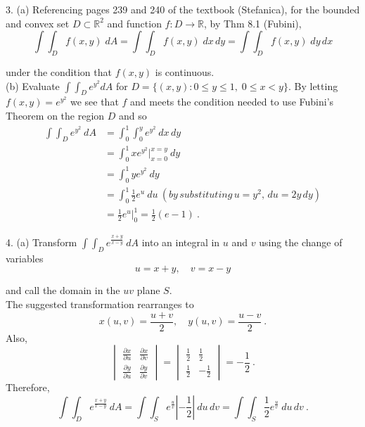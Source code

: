 \documentclass[11pt]{article}
\begin{document}
3. (a) Referencing pages 239 and 240 of the textbook (Stefanica), for the bounded and convex set $ D \subset \mathbb{R}^2 $ and function $ f : D \longrightarrow \mathbb{R} $, by Thm 8.1 (Fubini),
$$ \int \int_D f(x,y)\; dA = \int \int_D f(x,y)\; dx \, dy = \int \int_D f(x,y)\; dy \, dx$$

under the condition that $f(x,y)$ is continuous. \\

(b) Evaluate $\int \int_D e^{y^2} dA$ for $D = \{(x,y) : 0 \leq y \leq 1, \; 0 \leq x < y\} $.
By letting $f(x,y) = e^{y^2}$ we see that $f$ and  meets the condition needed to use Fubini's Theorem on the region $D$ and so
\begin{align*}
\int \int_D e^{y^2} \: dA & = \int_{0}^{1} \int_{0}^{y} e^{y^2} \: dx \, dy \\
& = \int_{0}^{1} xe^{y^2} \Bigr\rvert_{x=0}^{x=y} \: dy \\
& = \int_{0}^{1} ye^{y^2} \: dy \\
& = \int_{0}^{1} \frac{1}{2} e^u \: du \: (by \, substituting \, u = y^2, \, du = 2y \, dy) \\
& = \frac{1}{2} e^u \Bigr\rvert_{0}^{1} = \frac{1}{2} (e - 1) \: .
\end{align*}

4. (a) Transform $\int \int_D e^{\frac{x+y}{x-y}} \: dA$ into an integral in $u$ and $v$ using the change of variables
$$ u = x + y, \quad v = x - y$$

and call the domain in the $uv$ plane $S$. \\

The suggested transformation rearranges to 
$$ x(u,v) = \frac{u+v}{2}, \quad y(u,v) = \frac{u-v}{2} \:. $$
Also,
$$\begin{vmatrix}
\displaystyle\frac{\partial x}{\partial u} & \displaystyle\frac{\partial x}{\partial v} \\[2ex]
\displaystyle\frac{\partial y}{\partial u} & \displaystyle\frac{\partial y}{\partial v}
\end{vmatrix}
= \begin{vmatrix}
\displaystyle\frac{1}{2} & \displaystyle\frac{1}{2} \\[2ex] \displaystyle\frac{1}{2} & -\displaystyle\frac{1}{2}
\end{vmatrix} = -\displaystyle\frac{1}{2}\:.$$
Therefore,
$$ \int \int_D e^{\frac{x+y}{x-y}} \: dA  = \int \int_S e^{\frac{u}{v}} |-\frac{1}{2}| \: du \, dv = \int \int_S \frac{1}{2} e^{\frac{u}{v}} \: du \, dv \:.$$
\end{document}
